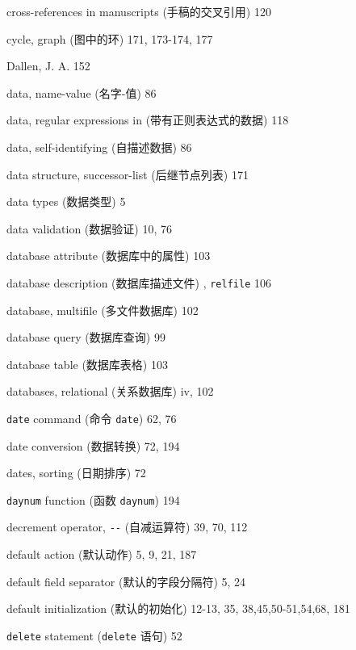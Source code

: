 \begin{multicols}{2}
\hangindent=2pc  cross-references in manuscripts
(手稿的交叉引用) 120

\hangindent=2pc  cycle, graph (图中的环) 171, 173-174, 177

\hangindent=2pc  Dallen, J. A. 152

\hangindent=2pc  data, name-value (\mbox{名字}-值) 86

\hangindent=2pc  data, regular expressions in
(带有正则表达式的数据) 118

\hangindent=2pc  data, self-identifying (自描述数据) 86

\hangindent=2pc  data structure, successor-list (后继节点列表) 171

\hangindent=2pc  data types (数据类型) 5

\hangindent=2pc  data validation (数据验证) 10, 76

\hangindent=2pc  database attribute (数据库中的属性) 103

\hangindent=2pc  database description (数据库描述文件) ,
\verb'relfile' 106

\hangindent=2pc  database, multifile (多文件数据库) 102

\hangindent=2pc  database query (数据库查询) 99

\hangindent=2pc  database table (数据库表格) 103

\hangindent=2pc  databases, relational (关系数据库) iv, 102


\hangindent=2pc  \verb'date' command (命令 \verb'date') 62, 76

\hangindent=2pc  date conversion (数据转换) 72, 194

\hangindent=2pc  dates, sorting (日期排序) 72

\hangindent=2pc  \verb'daynum' function (函数 \verb'daynum') 194

\hangindent=2pc  decrement operator, \verb'--' (自减运算符) 39, 70, 112

\hangindent=2pc  default action (默认动作) 5, 9, 21, 187

\hangindent=2pc  default field separator (默认的字段分隔符) 5, 24

\hangindent=2pc  default initialization (默认的初始化) 12-13, 35, 38,45,50-51,54,68, 181

\hangindent=2pc  \verb'delete' statement (\verb'delete' 语句) 52


\end{multicols}
